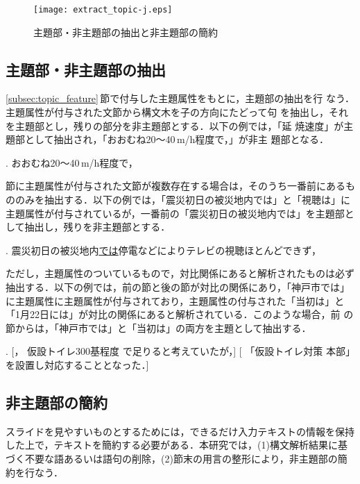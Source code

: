 \begin{figure*}[t]
 \begin{center}
     \texttt{[image: extract\_topic-j.eps]}
\caption{主題部・非主題部の抽出と非主題部の簡約}
\label{fig:topic_extract}
 \end{center} 
\end{figure*}


\subsection{主題部・非主題部の抽出}
\label{subsec:extract_topic}

\ref{subsec:topic_feature}\,節で付与した主題属性をもとに，主題部の抽出を行
なう．主題属性が付与された文節から構文木を子の方向にたどって句
を抽出し，それを主題部とし，残りの部分を非主題部とする．以下の例では，「延
焼速度」が主題部として抽出され，「おおむね20〜40\,m/h程度で，」が非主
題部となる．

\ex. おおむね20〜40\,m/h程度で，

節に主題属性が付与された文節が複数存在する場合は，そのうち一番前にあるも
ののみを抽出する．以下の例では，「震災初日の被災地内では」と「視聴は」に
主題属性が付与されているが，一番前の「震災初日の被災地内では」を主題部と
して抽出し，残りを非主題部とする．

\ex. 震災初日の被災地内\underline{\underline{では}}停電などによりテレビの視聴ほとんどできず，\label{ex:double_topic}

ただし，主題属性のついているもので，対比関係にあると解析されたものは必ず
抽出する．以下の例では，前の節と後の節が対比の関係にあり，「神戸市では」
に主題属性に主題属性が付与されており，主題属性の付与された「当初は」と
「1月22日には」が対比の関係にあると解析されている．このような場合，前
の節からは，「神戸市では」と「当初は」の両方を主題として抽出する．

\ex. [， 仮設トイレ300基程度
で足りると考えていたが，] [ 「仮設トイレ対策
本部」を設置し対応することとなった．]

\subsection{非主題部の簡約}

スライドを見やすいものとするためには，できるだけ入力テキストの情報を保持
した上で，テキストを簡約する必要がある．本研究では，(1)構文解析結果に基
づく不要な語あるいは語句の削除，(2)節末の用言の整形により，非主題部の簡
約を行なう．

